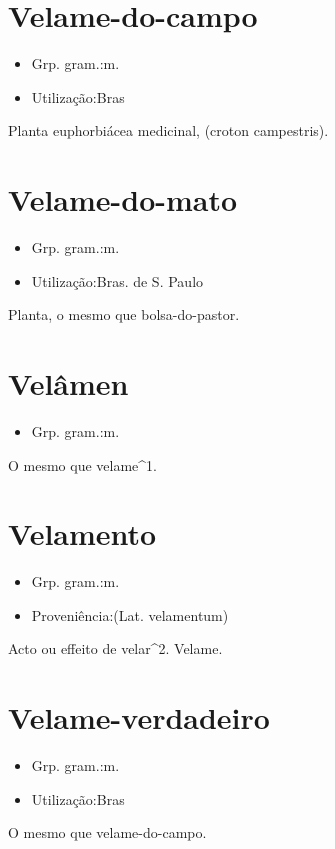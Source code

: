 \documentclass{article}
\begin{document}
\section{Velame-do-campo}
\begin{itemize}
\item {Grp. gram.:m.}
\end{itemize}
\begin{itemize}
\item {Utilização:Bras}
\end{itemize}
Planta euphorbiácea medicinal, (\textunderscore croton campestris\textunderscore ).
\section{Velame-do-mato}
\begin{itemize}
\item {Grp. gram.:m.}
\end{itemize}
\begin{itemize}
\item {Utilização:Bras. de S. Paulo}
\end{itemize}
Planta, o mesmo que \textunderscore bolsa-do-pastor\textunderscore .
\section{Velâmen}
\begin{itemize}
\item {Grp. gram.:m.}
\end{itemize}
O mesmo que \textunderscore velame\textunderscore ^1.
\section{Velamento}
\begin{itemize}
\item {Grp. gram.:m.}
\end{itemize}
\begin{itemize}
\item {Proveniência:(Lat. \textunderscore velamentum\textunderscore )}
\end{itemize}
Acto ou effeito de velar^2.
Velame.
\section{Velame-verdadeiro}
\begin{itemize}
\item {Grp. gram.:m.}
\end{itemize}
\begin{itemize}
\item {Utilização:Bras}
\end{itemize}
O mesmo que \textunderscore velame-do-campo\textunderscore .
\end{document}
